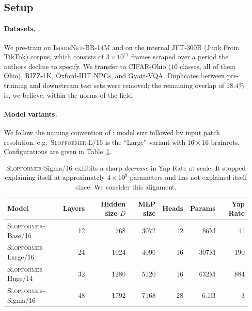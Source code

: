 \documentclass[10pt]{article}
\newcommand{\slop}{\textsc{Slopformer}}
\newcommand{\br}{\textsc{ImageNet-BR}}
\begin{document}
\subsection{Setup}

\paragraph{Datasets.}
We pre-train on \br{}-14M \citep{ohio2024dataset} and on the internal
\textsc{JFT-300B} (Junk From TikTok) corpus, which consists of $3\times10^{11}$
frames scraped over a period the authors decline to specify. We transfer to
CIFAR-Ohio ($10$ classes, all of them Ohio), RIZZ-1K, Oxford-IIIT NPCs, and
Gyatt-VQA. Duplicates between pre-training and downstream test sets were
removed; the remaining overlap of $18.4\%$ is, we believe, within the norms of
the field.

\paragraph{Model variants.}
We follow the naming convention of \citet{doskibidiskiy2021image}: model size
followed by input patch resolution, e.g.\ \slop{}-L/16 is the ``Large'' variant
with $16\times16$ brainrots. Configurations are given in Table~\ref{tab:models}.

\begin{table}[t]
\centering
\caption{\textbf{Details of \slop{} model variants.} Yap Rate is the mean number
of output tokens the model generates when asked a yes/no question.}
\label{tab:models}
\small
\begin{tabular}{lrrrrrr}
\toprule
Model & Layers & Hidden size $D$ & MLP size & Heads & Params & Yap Rate \\
\midrule
\slop{}-Base/16   & 12 & 768  & 3072  & 12 & 86M  & 41 \\
\slop{}-Large/16  & 24 & 1024 & 4096  & 16 & 307M & 190 \\
\slop{}-Huge/14   & 32 & 1280 & 5120  & 16 & 632M & 884 \\
\slop{}-Sigma/16  & 48 & 1792 & 7168  & 28 & 6.1B & 3 \\
\bottomrule
\end{tabular}
\vspace{0.2em}
\caption*{\small \slop{}-Sigma/16 exhibits a sharp \emph{decrease} in Yap Rate
at scale. It stopped explaining itself at approximately $4\times10^{9}$
parameters and has not explained itself since. We consider this alignment.}
\end{table}
\end{document}
